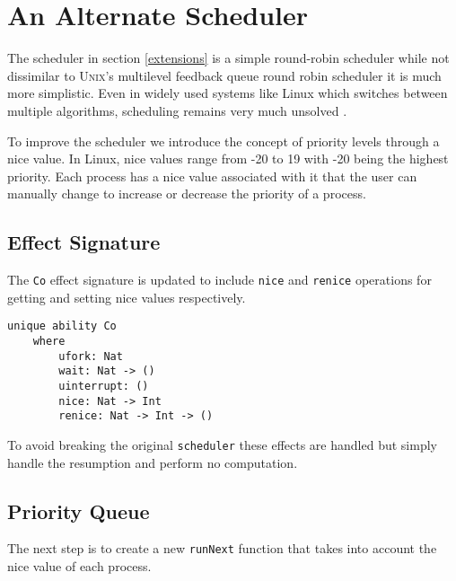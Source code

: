 \documentclass[logo,bsc,singlespacing,parskip]{infthesis}
\begin{document}
\section{An Alternate Scheduler}

The scheduler in section \ref{extensions} is a simple round-robin scheduler
while not dissimilar to \textsc{Unix}'s multilevel feedback queue round robin
scheduler it is much more simplistic. Even in widely used systems like Linux
which switches between multiple algorithms, scheduling remains very much
unsolved \cite{Lozi2016}.

To improve the scheduler we introduce the concept of priority levels through a
nice value. In Linux, nice values range from -20 to 19 with -20 being the
highest priority. Each process has a nice value associated with it that the
user can manually change to increase or decrease the priority of a process. 

\subsection{Effect Signature}

The \texttt{Co} effect signature is updated to include \texttt{nice} and
\texttt{renice} operations for getting and setting nice values respectively.

\begin{lstlisting}[language=unison]
unique ability Co 
    where 
        ufork: Nat
        wait: Nat -> ()
        uinterrupt: ()
        nice: Nat -> Int
        renice: Nat -> Int -> ()
\end{lstlisting}

To avoid breaking the original \texttt{scheduler} these effects are handled but
simply handle the resumption and perform no computation.

\subsection{Priority Queue}

The next step is to create a new \texttt{runNext} function that takes into
account the nice value of each process.
\end{document}
